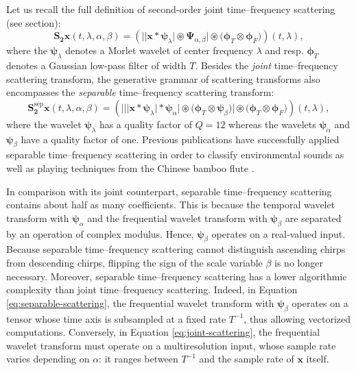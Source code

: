 \documentclass{bmcart}
\newcommand{\lnameref}[1]{%
\bgroup
\let\nmu\MakeLowercase
\nameref{#1}\egroup}
\newcommand{\nmu}{}
\begin{document}
Let us recall the full definition of second-order joint time--frequency scattering (see \lnameref{sec:methods} section):
\begin{equation}
\mathbf{S_2}\boldsymbol{x}(t,\lambda,\alpha,\beta) =
\left(
\Big\vert
\big\vert
\boldsymbol{x} \ast \boldsymbol{\psi}_{\lambda}
\big\vert
\circledast
\boldsymbol{\Psi}_{\alpha,\beta}
\Big\vert
\circledast
\big(\boldsymbol{\phi}_{T} \otimes \boldsymbol{\phi}_{F})
\right)(t,\lambda),
\label{eq:joint-scattering}
\end{equation}
where the $\boldsymbol{\psi}_{\lambda}$ denotes a Morlet wavelet of center frequency $\lambda$ and resp. $\boldsymbol{\phi}_T$ denotes a Gaussian low-pass filter of width $T$.
Besides the \emph{joint} time--frequency scattering transform, the generative grammar of scattering transforms \cite{lostanlen2019chapter} also encompasses the \emph{separable} time--frequency scattering transform:
\begin{equation}
\mathbf{S_2^{\mathrm{sep}}}\boldsymbol{x}(t,\lambda,\alpha,\beta) =
\left(
\bigg\vert
\Big\vert
\big\vert
\boldsymbol{x} \ast \boldsymbol{\psi}_{\lambda}
\big\vert
\ast
\boldsymbol{\psi}_{\alpha}
\Big\vert
\circledast
\big(\boldsymbol{\phi}_{T} \otimes \boldsymbol{\psi}_{\beta}\big)
\bigg\vert
\circledast
\big(\boldsymbol{\phi}_{T} \otimes \boldsymbol{\phi}_F\big)
\right)(t, \lambda),
\label{eq:separable-scattering}
\end{equation}
where the wavelet $\boldsymbol{\psi}_{\lambda}$ has a quality factor of $Q=12$ whereas the wavelets $\boldsymbol{\psi}_{\alpha}$ and $\boldsymbol{\psi}_{\beta}$ have a quality factor of one.
Previous publications have successfully applied separable time--frequency scattering in order to classify environmental sounds \cite{bauge2013icassp} as well as playing techniques from the Chinese bamboo flute \cite{wang2019ismir}.

In comparison with its joint counterpart, separable time--frequency scattering contains about half as many coefficients.
This is because the temporal wavelet transform with $\boldsymbol{\psi}_\alpha$ and the frequential wavelet transform with $\boldsymbol{\psi}_\beta$ are separated by an operation of complex modulus.
Hence, $\boldsymbol{\psi}_\beta$ operates on a real-valued input.
Because separable time--frequency scattering cannot distinguish ascending chirps from descending chirps, flipping the sign of the scale variable $\beta$ is no longer necessary.
Moreover, separable time--frequency scattering has a lower algorithmic complexity than joint time--frequency scattering.
Indeed, in Equation \ref{eq:separable-scattering}, the frequential wavelet transform with $\boldsymbol{\psi}_{\beta}$ operates on a tensor whose time axis is subsampled at a fixed rate $T^{-1}$, thus allowing vectorized computations.
Conversely, in Equation \ref{eq:joint-scattering}, the frequential wavelet transform must operate on a multiresolution input, whose sample rate varies  depending on $\alpha$: it ranges between $T^{-1}$ and the sample rate of $\boldsymbol{x}$ itself.
\end{document}
